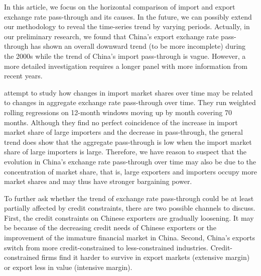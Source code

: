 In this article, we focus on the horizontal comparison of import and export exchange rate pass-through and its causes. In the future, we can possibly extend our methodology to reveal the time-series trend by varying periods. Actually, in our preliminary research, we found that China's export exchange rate pass-through has shown an overall downward trend (to be more incomplete) during the 2000s while the trend of China's import pass-through is vague. However, a more detailed investigation requires a longer panel with more information from recent years. 

\cite{devereux2017} attempt to study how changes in import market shares over time may be related to changes in aggregate exchange rate pass-through over time. They run weighted rolling regressions on 12-month windows moving up by month covering 70 months. Although they find no perfect coincidence of the increase in import market share of large importers and the decrease in pass-through, the general trend does show that the aggregate pass-through is low when the import market share of large importers is large. Therefore, we have reason to suspect that the evolution in China's exchange rate pass-through over time may also be due to the concentration of market share, that is, large exporters and importers occupy more market shares and may thus have stronger bargaining power.

To further ask whether the trend of exchange rate pass-through could be at least partially affected by credit constraints, there are two possible channels to discuss. First, the credit constraints on Chinese exporters are gradually loosening. It may be because of the decreasing credit needs of Chinese exporters or the improvement of the immature financial market in China. Second, China's exports switch from more credit-constrained to less-constrained industries. Credit-constrained firms find it harder to survive in export markets (extensive margin) or export less in value (intensive margin).
